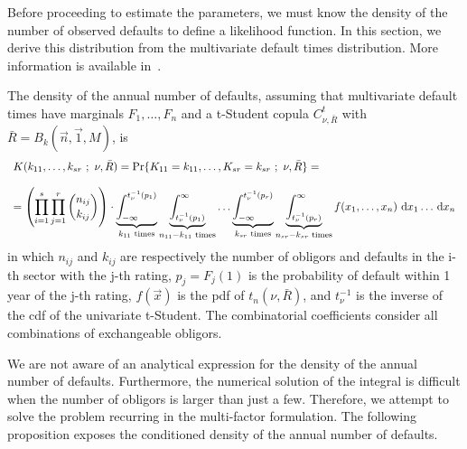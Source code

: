 \documentclass[11pt,fleqn]{book} %
\begin{document}
Before proceeding to estimate the parameters, we must know the density
of the number of observed defaults to define a likelihood function. In 
this section, we derive this distribution from the multivariate default 
times distribution. More information is available 
in~\cite{gordy:2002,roncalli:2004}.

\begin{proposition}
	The density of the annual number of defaults, assuming that multivariate 
	default times have marginals $F_1,\dots,F_n$ and a t-Student copula 
	$C_{\nu,\bar{R}}^t$ with $\bar{R} = B_k(\vec{n},\vec{1},M)$, is
	\begin{displaymath}
		\begin{array}{l}
			K(k_{11},\dots,k_{sr}\ ;\ \nu, \bar{R}) = 
			\Pr\{K_{11}=k_{11},\dots,K_{sr}=k_{sr}\ ;\ \nu, \bar{R}\} = \\
			\\
			= \left( \displaystyle \prod_{i=1}^s \prod_{j=1}^r \binom{n_{ij}}{k_{ij}} \right) \cdot
			\displaystyle
			\underbrace{\int_{-\infty}^{t_{\nu}^{-1}(p_1)}}_{k_{11} \text{ times}}
			\underbrace{\int_{t_{\nu}^{-1}(p_1)}^{\infty}}_{n_{11}-k_{11} \text{ times}}
			\dots
			\underbrace{\int_{-\infty}^{t_{\nu}^{-1}(p_r)}}_{k_{sr} \text{ times}}
			\underbrace{\int_{t_{\nu}^{-1}(p_r)}^{\infty}}_{n_{sr}-k_{sr} \text{ times}}
			f(x_1,\dots,x_n) \mathop{\,\mathrm{{}d}}\mathopen{} x_1 \dots \mathop{\,\mathrm{{}d}}\mathopen{} x_n
		\end{array}
	\end{displaymath}
	in which $n_{ij}$ and $k_{ij}$ are respectively the number of obligors and 
	defaults in the i-th sector with the j-th rating, $p_j = F_j(1)$ is the 
	probability of default within 1 year of the j-th rating, $f(\vec{x})$ 
	is the pdf of $t_n(\nu,\bar{R})$, and $t_{\nu}^{-1}$ is the inverse of the 
	cdf of the univariate t-Student. The combinatorial coefficients consider
	all combinations of exchangeable obligors.
\end{proposition}

We are not aware of an analytical expression for the density of the annual 
number of defaults. Furthermore, the numerical solution of the integral is 
difficult when the number of obligors is larger than just a few. Therefore,
we attempt to solve the problem recurring in the multi-factor formulation. 
The following proposition exposes the conditioned density of the annual 
number of defaults.
\end{document}
